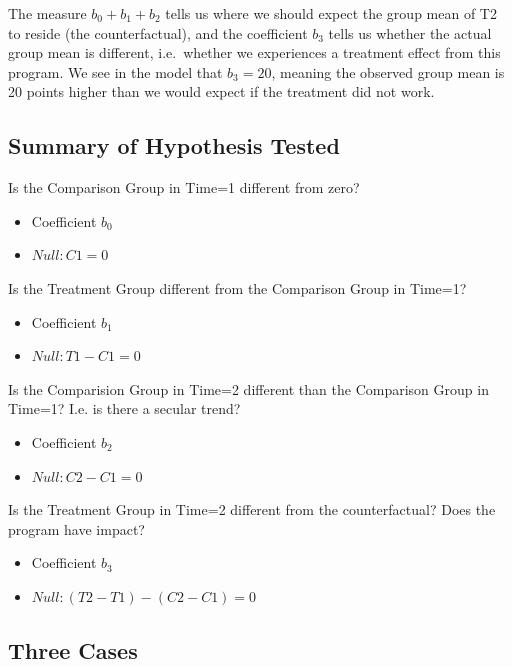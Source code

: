 \documentclass[]{book}
\providecommand{\tightlist}{%
  \setlength{\itemsep}{0pt}\setlength{\parskip}{0pt}}
\theoremstyle{definition}
\theoremstyle{definition}
\theoremstyle{definition}
\theoremstyle{remark}
\begin{document}
The measure \(b_{0} + b_{1} + b_{2}\) tells us where we should expect
the group mean of T2 to reside (the counterfactual), and the coefficient
\(b_{3}\) tells us whether the actual group mean is different,
i.e.~whether we experiences a treatment effect from this program. We see
in the model that \(b_{3}=20\), meaning the observed group mean is 20
points higher than we would expect if the treatment did not work.

\hypertarget{summary-of-hypothesis-tested}{%
\subsection{Summary of Hypothesis
Tested}\label{summary-of-hypothesis-tested}}

Is the Comparison Group in Time=1 different from zero?

\begin{itemize}
\tightlist
\item
  Coefficient \(b_{0}\)
\item
  \(Null: C1 = 0\)
\end{itemize}

Is the Treatment Group different from the Comparison Group in Time=1?

\begin{itemize}
\tightlist
\item
  Coefficient \(b_{1}\)
\item
  \(Null: T1 - C1 = 0\)
\end{itemize}

Is the Comparision Group in Time=2 different than the Comparison Group
in Time=1? I.e. is there a secular trend?

\begin{itemize}
\tightlist
\item
  Coefficient \(b_{2}\)
\item
  \(Null: C2 - C1 = 0\)
\end{itemize}

Is the Treatment Group in Time=2 different from the counterfactual? Does
the program have impact?

\begin{itemize}
\tightlist
\item
  Coefficient \(b_{3}\)
\item
  \(Null: (T2-T1) - (C2-C1) = 0\)
\end{itemize}

\hypertarget{three-cases}{%
\subsection{Three Cases}\label{three-cases}}
\end{document}
